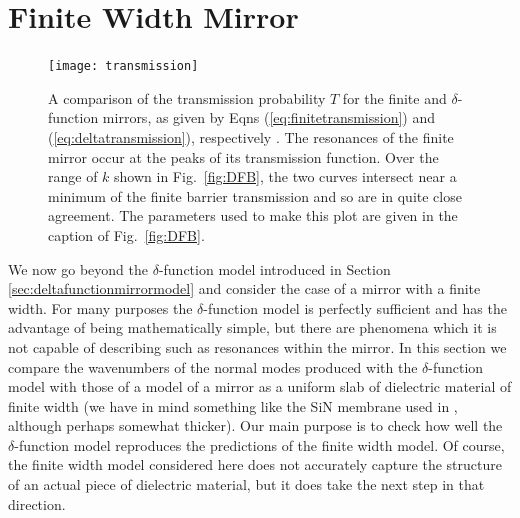 \documentclass[twocolumn,english,pra,aps,superscriptaddress,floatfix]{revtex4-1}
\begin{document}
\section{Finite Width Mirror}
\label{sec:FiniteWidthMirror}



\begin{figure}
\texttt{[image: transmission]}
\caption{A comparison of the transmission probability $T$ for the finite and $\delta$-function mirrors, as given by Eqns (\ref{eq:finitetransmission}) and (\ref{eq:deltatransmission}), respectively .  The resonances of the finite mirror occur at the peaks of its transmission function. Over the range of $k$ shown in Fig.\ \ref{fig:DFB}, the two curves intersect near a minimum of the finite barrier transmission and so are in quite close agreement. The parameters used to make this plot are given in the caption of Fig.\ \ref{fig:DFB}.}
 \label{fig:transmission}
\end{figure}

We now go beyond the $\delta$-function model introduced in Section \ref{sec:deltafunctionmirrormodel} and consider the case of a mirror with a finite width. For many purposes the $\delta$-function model is perfectly sufficient and has the advantage of being mathematically simple, but there are phenomena which it is not capable of describing such as resonances within the mirror. In this section we compare the wavenumbers of the normal modes produced with the $\delta$-function model  with those of a model of a mirror as a uniform slab of dielectric material of finite width (we have in mind something like the SiN membrane used in \cite{thompson08}, although perhaps somewhat thicker). Our main purpose is to check how well the $\delta$-function model reproduces the predictions of the finite width model. Of course, the finite width model considered here does not accurately capture the structure of an actual piece of dielectric material, but it does take the next step in that direction.
\end{document}
